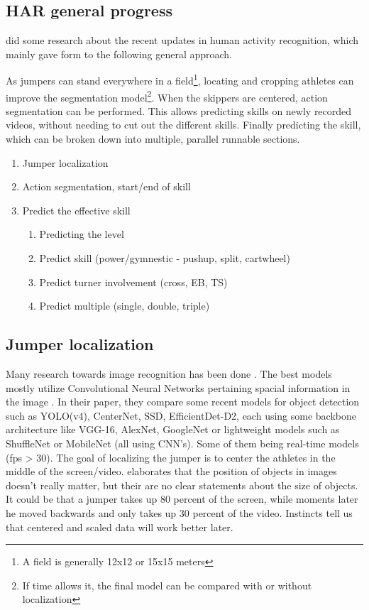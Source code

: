 \subsection{HAR general progress}

\textcite{Pareek_2020} did some research about the recent updates in human activity recognition, which mainly gave form to the following general approach.

As jumpers can stand everywhere in a field\footnote{A field is generally 12x12 or 15x15 meters}, locating and cropping athletes can improve the segmentation model\footnote{If time allows it, the final model can be compared with or without localization}. When the skippers are centered, action segmentation can be performed. This allows predicting skills on newly recorded videos, without needing to cut out the different skills. Finally predicting the skill, which can be broken down into multiple, parallel runnable sections.

\begin{enumerate}
    \item Jumper localization
    \item Action segmentation, start/end of skill
    \item Predict the effective skill
        \begin{enumerate}
            \item Predicting the level
            \item Predict skill (power/gymnestic - pushup, split, cartwheel)
            \item Predict turner involvement (cross, EB, TS)
            \item Predict multiple (single, double, triple)
        \end{enumerate}
\end{enumerate}

\subsection{Jumper localization}
\label{subsec:jumper localization}

Many research towards image recognition has been done \autocite{Zou_2023}. The best models mostly utilize Convolutional Neural Networks pertaining spacial information in the image \autocite{Zaidi_2021}. In their paper, they compare some recent models for object detection such as YOLO(v4), CenterNet, SSD, EfficientDet-D2, each using some backbone architecture like VGG-16, AlexNet, GoogleNet or lightweight models such as ShuffleNet or MobileNet (all using CNN's). Some of them being real-time models (fps > 30).
The goal of localizing the jumper is to center the athletes in the middle of the screen/video. \textcite{Bharadiya_2023} elaborates that the position of objects in images doesn't really matter, but their are no clear statements about the size of objects. It could be that a jumper takes up 80 percent of the screen, while moments later he moved backwards and only takes up 30 percent of the video. Instincts tell us that centered and scaled data will work better later.


